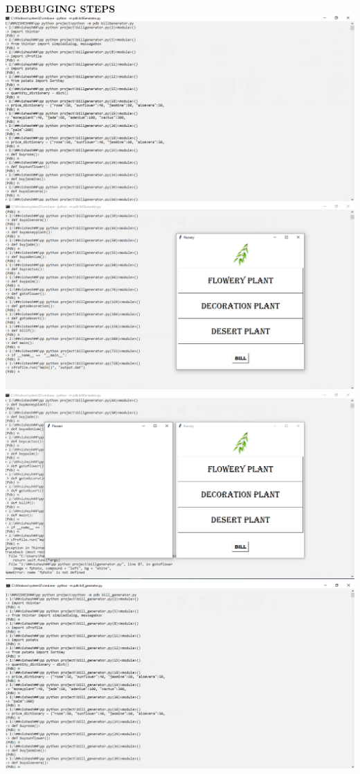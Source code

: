 \documentclass[11pt,a4paper]{article}
\begin{document}
\begin{center}
\textbf{DEBBUGING STEPS}\\
\includegraphics{debug1.png}\\
\includegraphics[scale = .6]{debug2.png}\\
\includegraphics[scale = .6]{debug3.png}\\
\includegraphics{debug4.png}\\

\end{center}
\end{document}
